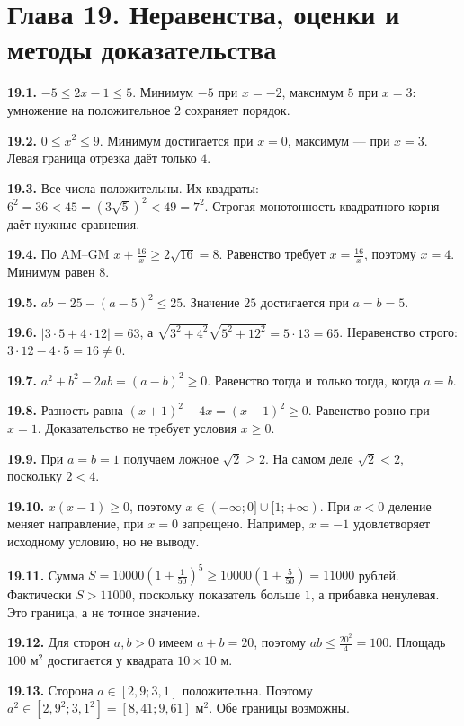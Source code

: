 \documentclass[12pt,a4paper,oneside,openany]{book}
\theoremstyle{colordef}\newtheorem{definition}{Определение}[chapter]
\theoremstyle{plain}\newtheorem{theorem}{Теорема}[chapter]
\theoremstyle{definition}\newtheorem{axiom}{Аксиома}[chapter]
\begin{document}
\section*{Глава 19. Неравенства, оценки и методы доказательства}
\begingroup\setlength{\parskip}{3pt}
\textbf{19.1.} \(-5\le2x-1\le5\). Минимум \(-5\) при \(x=-2\), максимум \(5\) при \(x=3\): умножение на положительное \(2\) сохраняет порядок.\par
\textbf{19.2.} \(0\le x^2\le9\). Минимум достигается при \(x=0\), максимум — при \(x=3\). Левая граница отрезка даёт только \(4\).\par
\textbf{19.3.} Все числа положительны. Их квадраты: \(6^2=36<45=(3\sqrt5)^2<49=7^2\). Строгая монотонность квадратного корня даёт нужные сравнения.\par
\textbf{19.4.} По AM--GM \(x+\frac{16}{x}\ge2\sqrt{16}=8\). Равенство требует \(x=\frac{16}{x}\), поэтому \(x=4\). Минимум равен \(8\).\par
\textbf{19.5.} \(ab=25-(a-5)^2\le25\). Значение \(25\) достигается при \(a=b=5\).\par
\textbf{19.6.} \(|3\cdot5+4\cdot12|=63\), а \(\sqrt{3^2+4^2}\sqrt{5^2+12^2}=5\cdot13=65\). Неравенство строго: \(3\cdot12-4\cdot5=16\ne0\).\par
\textbf{19.7.} \(a^2+b^2-2ab=(a-b)^2\ge0\). Равенство тогда и только тогда, когда \(a=b\).\par
\textbf{19.8.} Разность равна \((x+1)^2-4x=(x-1)^2\ge0\). Равенство ровно при \(x=1\). Доказательство не требует условия \(x\ge0\).\par
\textbf{19.9.} При \(a=b=1\) получаем ложное \(\sqrt2\ge2\). На самом деле \(\sqrt2<2\), поскольку \(2<4\).\par
\textbf{19.10.} \(x(x-1)\ge0\), поэтому \(x\in(-\infty;0]\cup[1;+\infty)\). При \(x<0\) деление меняет направление, при \(x=0\) запрещено. Например, \(x=-1\) удовлетворяет исходному условию, но не выводу.\par
\textbf{19.11.} Сумма \(S=10000(1+\frac1{50})^5\ge10000(1+\frac5{50})=11000\) рублей. Фактически \(S>11000\), поскольку показатель больше \(1\), а прибавка ненулевая. Это граница, а не точное значение.\par
\textbf{19.12.} Для сторон \(a,b>0\) имеем \(a+b=20\), поэтому \(ab\le\frac{20^2}{4}=100\). Площадь \(100\) м\(^2\) достигается у квадрата \(10\times10\) м.\par
\textbf{19.13.} Сторона \(a\in[2{,}9;3{,}1]\) положительна. Поэтому \(a^2\in[2{,}9^2;3{,}1^2]=[8{,}41;9{,}61]\) м\(^2\). Обе границы возможны.\par
\end{document}
